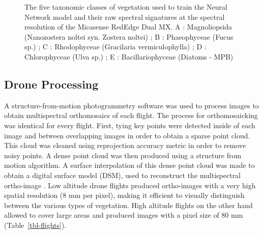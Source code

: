 \documentclass[
  number]{elsarticle}
\begin{document}
\label{cell-fig-vegetation}
\begin{figure}[H]


\caption{\label{fig-vegetation}The five taxonomic classes of vegetation
used to train the Neural Network model and their raw spectral signatures
at the spectral resolution of the Micasense RedEdge Dual MX. A :
Magnoliopsida (Nanozostera noltei syn. Zostera noltei) ; B :
Phaeophyceae (Fucus sp.) ; C : Rhodophyceae (Gracilaria vermiculophylla)
; D : Chlorophyceae (Ulva sp.) ; E : Bacillariophyceae (Diatoms - MPB)}

\end{figure}%

\subsection{Drone Processing}\label{drone-processing}

A structure-from-motion photogrammetry software \citep[Agisoft
Metashape,][]{agisoft}was used to process images to obtain multispectral
orthomosaics of each flight. The process for orthomosaicking was
identical for every flight. First, tying key points were detected inside
of each image and between overlapping images in order to obtain a sparse
point cloud. This cloud was cleaned using reprojection accuracy metric
in order to remove noisy points. A dense point cloud was then produced
using a structure from motion algorithm. A surface interpolation of this
dense point cloud was made to obtain a digital surface model (DSM), used
to reconstruct the multispectral ortho-image \citep{nebel2020review}.
Low altitude drone flights produced ortho-images with a very high
spatial resolution (8 mm per pixel), making it efficient to visually
distinguish between the various types of vegetation. High altitude
flights on the other hand allowed to cover large areas and produced
images with a pixel size of 80 mm (Table~\ref{tbl-flights}).
\end{document}
